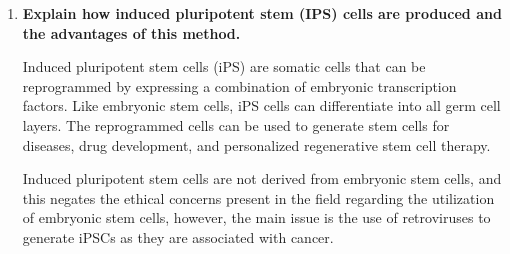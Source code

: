 \documentclass[a4paper]{article}
\begin{document}
\begin{enumerate}
    \item \textbf{Explain how induced pluripotent stem (IPS) cells are produced and the advantages of this method. \cite{Surat2019}}

Induced pluripotent stem cells (iPS) are somatic cells that can be reprogrammed by expressing a combination of embryonic transcription factors. Like embryonic stem cells, iPS cells can differentiate into all germ cell layers. The reprogrammed cells can be used to generate stem cells for diseases, drug development, and personalized regenerative stem cell therapy. 

Induced pluripotent stem cells are not derived from embryonic stem cells, and this negates the ethical concerns present in the field regarding the utilization of embryonic stem cells, however, the main issue is the use of retroviruses to generate iPSCs as they are associated with cancer.


\end{enumerate}

\medskip



\end{document}
